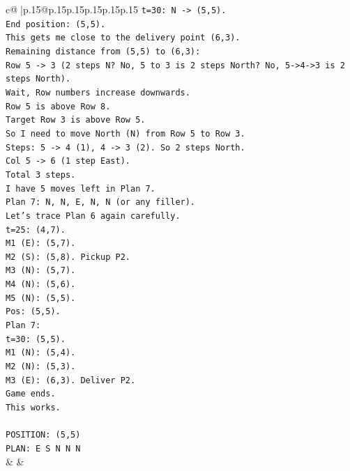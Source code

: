 \documentclass{article}
\begin{document}
{\begin{supertabular}{c@{$\;$}|p{.15\linewidth}@{}p{.15\linewidth}p{.15\linewidth}p{.15\linewidth}p{.15\linewidth}p{.15\linewidth}}
{{{\texttt{t=30: N {-}> (5,5).} \\
\texttt{End position: (5,5).} \\
\texttt{This gets me close to the delivery point (6,3).} \\
\texttt{Remaining distance from (5,5) to (6,3):} \\
\texttt{Row 5 {-}> 3 (2 steps N? No, 5 to 3 is 2 steps North? No, 5{-}>4{-}>3 is 2 steps North).} \\
\texttt{Wait, Row numbers increase downwards.} \\
\texttt{Row 5 is above Row 8.} \\
\texttt{Target Row 3 is above Row 5.} \\
\texttt{So I need to move North (N) from Row 5 to Row 3.} \\
\texttt{Steps: 5 {-}> 4 (1), 4 {-}> 3 (2). So 2 steps North.} \\
\texttt{Col 5 {-}> 6 (1 step East).} \\
\texttt{Total 3 steps.} \\
\texttt{I have 5 moves left in Plan 7.} \\
\texttt{Plan 7: N, N, E, N, N (or any filler).} \\
\texttt{Let's trace Plan 6 again carefully.} \\
\texttt{t=25: (4,7).} \\
\texttt{M1 (E): (5,7).} \\
\texttt{M2 (S): (5,8). Pickup P2.} \\
\texttt{M3 (N): (5,7).} \\
\texttt{M4 (N): (5,6).} \\
\texttt{M5 (N): (5,5).} \\
\texttt{Pos: (5,5).} \\
\texttt{Plan 7:} \\
\texttt{t=30: (5,5).} \\
\texttt{M1 (N): (5,4).} \\
\texttt{M2 (N): (5,3).} \\
\texttt{M3 (E): (6,3). Deliver P2.} \\
\texttt{Game ends.} \\
\texttt{This works.} \\
\\ 
\texttt{POSITION: (5,5)} \\
\texttt{PLAN: E S N N N} \\
            }
        }
    }
    & & \\ \\


\end{supertabular}}
\end{document}
